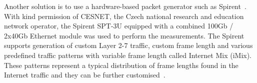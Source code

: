 Another solution is to use a hardware-based packet generator such as Spirent~\cite{spirent}.
With kind permission of CESNET, the Czech national research and education network operator,
the Spirent SPT-3U equipped with a combined 100Gb / 2x40Gb Ethernet module was used to perform the measurements.
The Spirent supports generation of custom Layer 2-7 traffic, custom frame length and various
predefined traffic patterns with variable frame length called Internet Mix (iMix).
These patterns represent a typical distribution of frame lengths found in the Internet traffic
and they can be further customised~\cite{spirent}.
